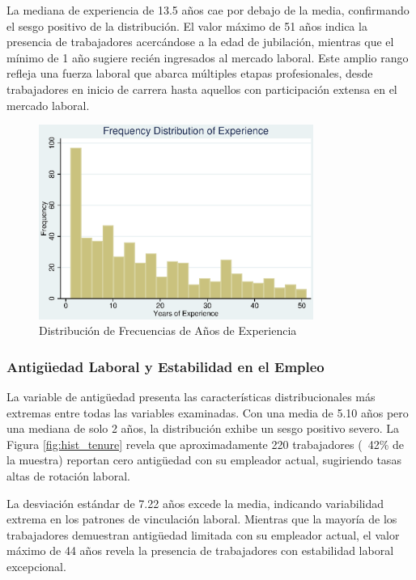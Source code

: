 \documentclass[12pt]{article}
\begin{document}
La mediana de experiencia de 13.5 años cae por debajo de la media, confirmando el sesgo positivo de la distribución. El valor máximo de 51 años indica la presencia de trabajadores acercándose a la edad de jubilación, mientras que el mínimo de 1 año sugiere recién ingresados al mercado laboral. Este amplio rango refleja una fuerza laboral que abarca múltiples etapas profesionales, desde trabajadores en inicio de carrera hasta aquellos con participación extensa en el mercado laboral.

\begin{figure}[h!]
\centering
\includegraphics[width=0.8\textwidth]{Figures/0201-hist_expr.eps}
\caption{Distribución de Frecuencias de Años de Experiencia}
\label{fig:hist_exper}
\end{figure}

\subsubsection*{Antigüedad Laboral y Estabilidad en el Empleo}

La variable de antigüedad presenta las características distribucionales más extremas entre todas las variables examinadas. Con una media de 5.10 años pero una mediana de solo 2 años, la distribución exhibe un sesgo positivo severo. La Figura \ref{fig:hist_tenure} revela que aproximadamente 220 trabajadores (~42\% de la muestra) reportan cero antigüedad con su empleador actual, sugiriendo tasas altas de rotación laboral.

La desviación estándar de 7.22 años excede la media, indicando variabilidad extrema en los patrones de vinculación laboral. Mientras que la mayoría de los trabajadores demuestran antigüedad limitada con su empleador actual, el valor máximo de 44 años revela la presencia de trabajadores con estabilidad laboral excepcional.
\end{document}

